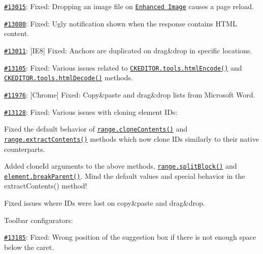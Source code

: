 \begin{DoxyItemize}
\item \href{http://dev.ckeditor.com/ticket/13015}{\tt \#13015}\+: Fixed\+: Dropping an image file on \href{http://ckeditor.com/addon/image2}{\tt Enhanced Image} causes a page reload.
\item \href{http://dev.ckeditor.com/ticket/13080}{\tt \#13080}\+: Fixed\+: Ugly notification shown when the response contains H\+T\+ML content.
\item \href{http://dev.ckeditor.com/ticket/13011}{\tt \#13011}\+: \mbox{[}I\+E8\mbox{]} Fixed\+: Anchors are duplicated on drag\&drop in specific locations.
\item \href{http://dev.ckeditor.com/ticket/13105}{\tt \#13105}\+: Fixed\+: Various issues related to \href{http://docs.ckeditor.com/#!/api/CKEDITOR.tools-method-htmlEncode}{\tt {\ttfamily C\+K\+E\+D\+I\+T\+O\+R.\+tools.\+html\+Encode()}} and \href{http://docs.ckeditor.com/#!/api/CKEDITOR.tools-method-htmlDecode}{\tt {\ttfamily C\+K\+E\+D\+I\+T\+O\+R.\+tools.\+html\+Decode()}} methods.
\item \href{http://dev.ckeditor.com/ticket/11976}{\tt \#11976}\+: \mbox{[}Chrome\mbox{]} Fixed\+: Copy\&paste and drag\&drop lists from Microsoft Word.
\item \href{http://dev.ckeditor.com/ticket/13128}{\tt \#13128}\+: Fixed\+: Various issues with cloning element I\+Ds\+:
\begin{DoxyItemize}
\item Fixed the default behavior of \href{http://docs.ckeditor.com/#!/api/CKEDITOR.dom.range-method-cloneContents}{\tt {\ttfamily range.\+clone\+Contents()}} and \href{http://docs.ckeditor.com/#!/api/CKEDITOR.dom.range-method-extractContents}{\tt {\ttfamily range.\+extract\+Contents()}} methods which now clone I\+Ds similarly to their native counterparts.
\item Added {\ttfamily clone\+Id} arguments to the above methods, \href{http://docs.ckeditor.com/#!/api/CKEDITOR.dom.range-method-splitBlock}{\tt {\ttfamily range.\+split\+Block()}} and \href{http://docs.ckeditor.com/#!/api/CKEDITOR.dom.element-method-breakParent}{\tt {\ttfamily element.\+break\+Parent()}}. Mind the default values and special behavior in the {\ttfamily extract\+Contents()} method!
\item Fixed issues where I\+Ds were lost on copy\&paste and drag\&drop.
\end{DoxyItemize}
\item Toolbar configurators\+:
\begin{DoxyItemize}
\item \href{http://dev.ckeditor.com/ticket/13185}{\tt \#13185}\+: Fixed\+: Wrong position of the suggestion box if there is not enough space below the caret.

\end{DoxyItemize}
\end{DoxyItemize}
